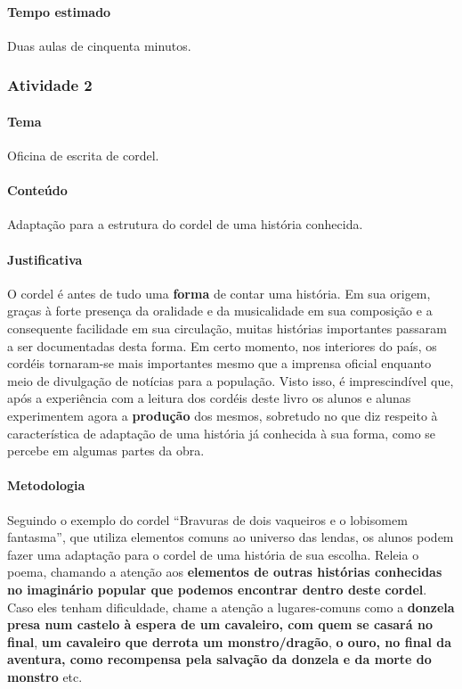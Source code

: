 \documentclass[11pt]{extarticle}
\begin{document}
\paragraph{Tempo estimado} Duas aulas de cinquenta minutos.


\subsubsection{Atividade 2}


\paragraph{Tema} Oficina de escrita de cordel.


\paragraph{Conteúdo} Adaptação para a estrutura do cordel
de uma história conhecida.

\paragraph{Justificativa} O cordel é antes de tudo uma \textbf{forma} 
de contar uma história. Em sua origem, graças à forte presença
da oralidade e da musicalidade em sua composição e a consequente
facilidade em sua circulação, muitas histórias importantes passaram
a ser documentadas desta forma. Em certo momento, nos interiores 
do país, os cordéis tornaram-se mais importantes mesmo que a imprensa
oficial enquanto meio de divulgação de notícias para a população. 
Visto isso, é imprescindível que, após a experiência com a leitura dos
cordéis deste livro os alunos e alunas experimentem agora a \textbf{produção}
dos mesmos, sobretudo no que diz respeito à característica de adaptação 
de uma história já conhecida à sua forma, como se percebe em algumas
partes da obra.

\paragraph{Metodologia} 
Seguindo o exemplo do cordel ``Bravuras de dois vaqueiros e o lobisomem 
fantasma'', que utiliza elementos comuns ao universo das lendas, os alunos 
podem fazer uma adaptação para o cordel de uma história de sua escolha.
Releia o poema, chamando a atenção aos \textbf{elementos de outras histórias conhecidas 
no imaginário popular que podemos encontrar dentro deste cordel}. Caso eles 
tenham dificuldade, chame a atenção a lugares-comuns  como a \textbf{donzela presa 
num castelo à espera de um cavaleiro, com quem se casará no final}, \textbf{um cavaleiro 
que derrota um monstro/dragão}, \textbf{o ouro, no final da aventura, como recompensa pela salvação da donzela 
e da morte do monstro} etc.
\end{document}
